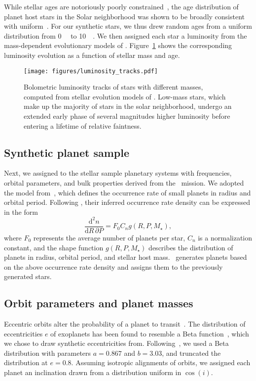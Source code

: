 \documentclass[twocolumn,twocolappendix]{aastex631}
\begin{document}
While stellar ages are notoriously poorly constrained~\cite[e.g.,][]{Adams2005}, the age distribution of planet host stars in the Solar neighborhood was shown to be broadly consistent with uniform~\citep{Reid2007,Gaidos2023}.
For our synthetic stars, we thus drew random ages from a uniform distribution from \SI{0}{\giga\year} to \SI{10}{\giga\year}.
We then assigned each star a luminosity from the mass-dependent evolutionary models of \citet{Baraffe1998}.
Figure~\ref{fig:luminosity_tracks} shows the corresponding luminosity evolution as a function of stellar mass and age.
\begin{figure}[ht!]
    \begin{centering}
        \texttt{[image: figures/luminosity\_tracks.pdf]}
        \caption{
            Bolometric luminosity tracks of stars with different masses, computed from stellar evolution models of \citet{Baraffe1998}.
            Low-mass stars, which make up the majority of stars in the solar neighborhood, undergo an extended early phase of several magnitudes higher luminosity before entering a lifetime of relative faintness.
        }
        \label{fig:luminosity_tracks}
    \end{centering}
\end{figure}


\subsection{Synthetic planet sample}\label{sec:syn_planets}
Next, we assigned to the stellar sample planetary systems with frequencies, orbital parameters, and bulk properties derived from the \kepler\ mission.
We adopted the model from~\citet{Bergsten2022}, which defines the occurrence rate of small planets in radius and orbital period.
Following \citet{Youdin2011a}, their inferred occurrence rate density can be expressed in the form
\begin{equation}
    \frac{\mathrm{d}^2n}{\mathrm{d}R \, \partial P} = F_0 C_n g(R, P, M_\star),
\end{equation}
where $F_0$ represents the average number of planets per star, $C_n$ is a normalization constant, and the shape function $g(R, P, M_\star)$ describes the distribution of planets in radius, orbital period, and stellar host mass.
\bioverse\ generates planets based on the above occurrence rate density and assigns them to the previously generated stars.


\subsection{Orbit parameters and planet masses}\label{sec:met-orbits_masses}
Eccentric orbits alter the probability of a planet to transit~\citep[e.g.,][]{Barnes2007a}.
The distribution of eccentricities $e$ of exoplanets has been found to resemble a Beta function~\citep{Kipping2013b}, which we chose to draw synthetic eccentricities from.
Following~\citet{Kipping2013b}, we used a Beta distribution with parameters $a=0.867$ and $b=3.03$, and truncated the distribution at $e = 0.8$.
Assuming isotropic alignments of orbits, we assigned each planet an inclination drawn from a distribution uniform in $\cos(i)$.
\end{document}
